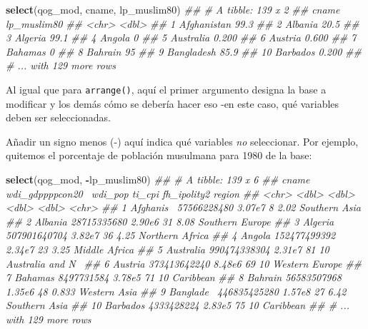 \documentclass[]{book}
\newenvironment{Shaded}{\begin{snugshade}}{\end{snugshade}}
\newcommand{\CommentTok}[1]{\textcolor[rgb]{0.56,0.35,0.01}{\textit{#1}}}
\newcommand{\KeywordTok}[1]{\textcolor[rgb]{0.13,0.29,0.53}{\textbf{#1}}}
\newcommand{\NormalTok}[1]{#1}
\newcommand{\OperatorTok}[1]{\textcolor[rgb]{0.81,0.36,0.00}{\textbf{#1}}}
\begin{document}
\begin{Shaded}
\begin{Highlighting}[]
\KeywordTok{select}\NormalTok{(qog_mod, cname, lp_muslim80)}
\CommentTok{## # A tibble: 139 x 2}
\CommentTok{##    cname       lp_muslim80}
\CommentTok{##    <chr>             <dbl>}
\CommentTok{##  1 Afghanistan      99.3  }
\CommentTok{##  2 Albania          20.5  }
\CommentTok{##  3 Algeria          99.1  }
\CommentTok{##  4 Angola            0    }
\CommentTok{##  5 Australia         0.200}
\CommentTok{##  6 Austria           0.600}
\CommentTok{##  7 Bahamas           0    }
\CommentTok{##  8 Bahrain          95    }
\CommentTok{##  9 Bangladesh       85.9  }
\CommentTok{## 10 Barbados          0.200}
\CommentTok{## # ... with 129 more rows}
\end{Highlighting}
\end{Shaded}

Al igual que para \texttt{arrange()}, aquí el primer argumento designa
la base a modificar y los demás cómo se debería hacer eso -en este caso,
qué variables deben ser seleccionadas.

Añadir un signo menos (-) aquí indica qué variables \emph{no}
seleccionar. Por ejemplo, quitemos el porcentaje de población musulmana
para 1980 de la base:

\begin{Shaded}
\begin{Highlighting}[]
\KeywordTok{select}\NormalTok{(qog_mod, }\OperatorTok{-}\NormalTok{lp_muslim80)}
\CommentTok{## # A tibble: 139 x 6}
\CommentTok{##    cname     wdi_gdppppcon20~  wdi_pop ti_cpi fh_ipolity2 region          }
\CommentTok{##    <chr>                <dbl>    <dbl>  <dbl>       <dbl> <chr>           }
\CommentTok{##  1 Afghanis~      57566228480   3.07e7      8       2.02  Southern Asia   }
\CommentTok{##  2 Albania        28715335680   2.90e6     31       8.08  Southern Europe }
\CommentTok{##  3 Algeria       507901640704   3.82e7     36       4.25  Northern Africa }
\CommentTok{##  4 Angola        152477499392   2.34e7     23       3.25  Middle Africa   }
\CommentTok{##  5 Australia     990474338304   2.31e7     81      10     Australia and N~}
\CommentTok{##  6 Austria       373413642240   8.48e6     69      10     Western Europe  }
\CommentTok{##  7 Bahamas         8497731584   3.78e5     71      10     Caribbean       }
\CommentTok{##  8 Bahrain        56583507968   1.35e6     48       0.833 Western Asia    }
\CommentTok{##  9 Banglade~     446835425280   1.57e8     27       6.42  Southern Asia   }
\CommentTok{## 10 Barbados        4333428224   2.83e5     75      10     Caribbean       }
\CommentTok{## # ... with 129 more rows}
\end{Highlighting}
\end{Shaded}
\end{document}
